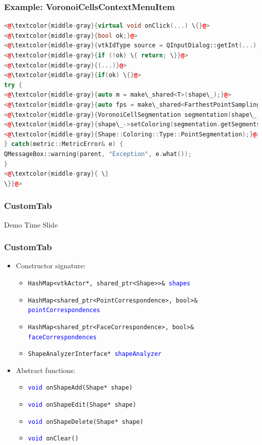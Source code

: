 \documentclass[compress]{beamer}
\begin{document}
\begin{frame}[fragile]
\frametitle{Example: VoronoiCellsContextMenuItem}

\begin{lstlisting}[language=C++, numbers=none]
<@\textcolor{middle-gray}{virtual void onClick(...) \{}@>
<@\textcolor{middle-gray}{bool ok;}@>
<@\textcolor{middle-gray}{vtkIdType source = QInputDialog::getInt(...);}@>
<@\textcolor{middle-gray}{if (!ok) \{ return; \}}@>
<@\textcolor{middle-gray}{(...)}@>
<@\textcolor{middle-gray}{if(ok) \{}@>
try {
<@\textcolor{middle-gray}{auto m = make\_shared<T>(shape\_);}@>
<@\textcolor{middle-gray}{auto fps = make\_shared<FarthestPointSampling>(shape\_, m, source, numberOfSegments);}@>
<@\textcolor{middle-gray}{VoronoiCellSegmentation segmentation(shape\_, m, fps);}@>
<@\textcolor{middle-gray}{shape\_->setColoring(segmentation.getSegments(), }@>
<@\textcolor{middle-gray}{Shape::Coloring::Type::PointSegmentation);}@>
} catch(metric::MetricError& e) {
QMessageBox::warning(parent, "Exception", e.what());
}
<@\textcolor{middle-gray}{ \}
\}}@>
\end{lstlisting}

\end{frame}

\begin{frame}
\frametitle{CustomTab}

Demo Time Slide

\end{frame}

\begin{frame}
\frametitle{CustomTab}

\begin{itemize}
\item Constructor signature:
\begin{itemize}
\item \texttt{HashMap<vtkActor*, shared\_ptr<Shape>>\& \textcolor{blue}{shapes}}
\item \texttt{HashMap<shared\_ptr<PointCorrespondence>, bool>\& \textcolor{blue}{pointCorrespondences}}
\item \texttt{HashMap<shared\_ptr<FaceCorrespondence>, bool>\& \textcolor{blue}{faceCorrespondences}}
\item \texttt{ShapeAnalyzerInterface* \textcolor{blue}{shapeAnalyzer}}
\end{itemize}
\item Abstract functions:
\begin{itemize}
\item \texttt{\textcolor{blue}{void} onShapeAdd(Shape* shape)}
\item \texttt{\textcolor{blue}{void} onShapeEdit(Shape* shape)}
\item \texttt{\textcolor{blue}{void} onShapeDelete(Shape* shape)}
\item \texttt{\textcolor{blue}{void} onClear()}
\end{itemize}
\end{itemize}
\end{frame}
\end{document}
